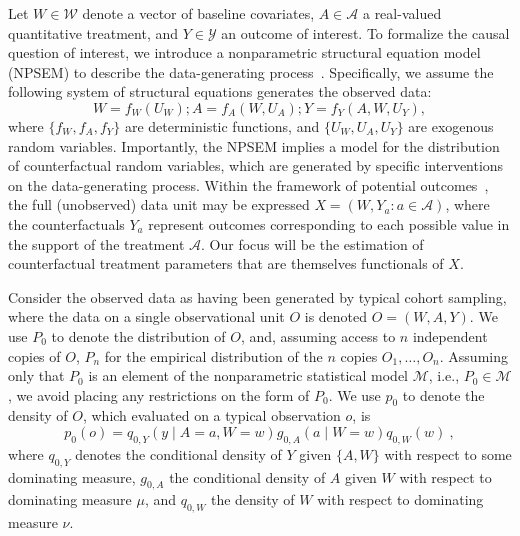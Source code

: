 Let $W \in \mathcal{W}$ denote a vector of baseline covariates, $A \in
\mathcal{A}$ a real-valued quantitative treatment, and $Y \in \mathcal{Y}$ an
outcome of interest. To formalize the causal question of interest, we introduce
a nonparametric structural equation model (NPSEM) to describe the
data-generating process~\citep{pearl2009causality}. Specifically, we assume the
following system of structural equations generates the observed data:
\begin{equation*}\label{npsem}
  W = f_W(U_W); A = f_A(W, U_A); Y = f_Y(A, W, U_Y),
\end{equation*}
where $\{f_W, f_A, f_Y\}$ are deterministic functions, and $\{U_W, U_A, U_Y\}$
are exogenous random variables. Importantly, the NPSEM implies a model for the
distribution of counterfactual random variables, which are generated by specific
interventions on the data-generating process. Within the framework of potential
outcomes~\citep{neyman1938contribution, rubin1978bayesian,
rubin1980randomization, rubin2005causal}, the full (unobserved) data unit may be
expressed $X = (W, Y_a: a \in \mathcal{A})$, where the counterfactuals $Y_a$
represent outcomes corresponding to each possible value in the support of the
treatment $\mathcal{A}$. Our focus will be the estimation of counterfactual
treatment parameters that are themselves functionals of $X$.

Consider the observed data as having been generated by typical cohort sampling,
where the data on a single observational unit $O$ is denoted $O = (W, A, Y)$. We
use $P_0$ to denote the distribution of $O$, and, assuming access to $n$
independent copies of $O$, $P_n$ for the empirical distribution of the $n$
copies $O_1, \ldots, O_n$. Assuming only that $P_0$ is an element of the
nonparametric statistical model $\mathcal{M}$, i.e., $P_0 \in \mathcal{M}$, we
avoid placing any restrictions on the form of $P_0$. We use $p_0$ to denote the
density of $O$, which evaluated on a typical observation $o$, is
\begin{equation*}\label{likelihood_factorization}
  p_0(o) = q_{0,Y}(y \mid A = a, W = w) g_{0,A}(a \mid W = w) q_{0,W}(w) \ ,
\end{equation*}
where $q_{0, Y}$ denotes the conditional density of $Y$ given $\{A, W\}$ with
respect to some dominating measure, $g_{0, A}$ the conditional density of $A$
given $W$ with respect to dominating measure $\mu$, and $q_{0, W}$ the density
of $W$ with respect to dominating measure $\nu$.

